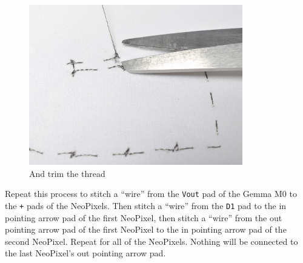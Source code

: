 \documentclass[letterpaper,twoside,12pt]{article}
\begin{document}
\begin{figure}[hbpt]\begin{centering}%
\includegraphics[height=2.75in]{flora_DSC_0125.jpg}
\caption{And trim the thread}
\label{fig:flora_DSC_0125}
\end{centering}\end{figure}
\clearpage
Repeat this process to stitch a ``wire'' from the \texttt{Vout} pad of the
Gemma M0 to the \texttt{+} pads of the NeoPixels. Then stitch a ``wire'' from
the \texttt{D1} pad to the in pointing arrow pad of the first NeoPixel, then
stitch a ``wire'' from the out pointing arrow pad of the first NeoPixel to the 
in pointing arrow pad of the second NeoPixel. Repeat for all of the NeoPixels. 
Nothing will be connected to the last NeoPixel's out pointing arrow pad.
\end{document}
